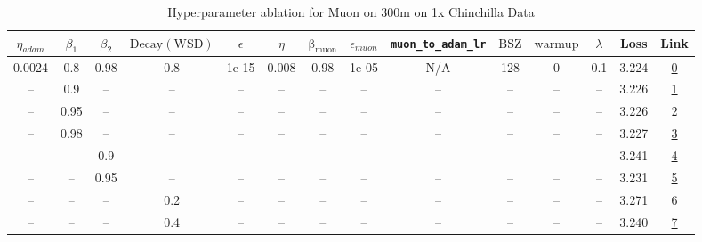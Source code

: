 \begin{table}[H]
\centering
\caption{Hyperparameter ablation for Muon on 300m on 1x Chinchilla Data}
\label{tab:ablation_muon_300m_1}
\begin{tabular}{cccccccccccccc}
\toprule
$\eta_{adam}$ & $\beta_1$ & $\beta_2$ & $\mathrm{Decay (WSD)}$ & $\epsilon$ & $\eta$ & $\mathrm{\beta_{muon}}$ & $\epsilon_{muon}$ & \texttt{muon\_to\_adam\_lr} & $\mathrm{BSZ}$ & $\mathrm{warmup}$ & $\lambda$ & Loss & Link \\
\midrule
0.0024 & 0.8 & 0.98 & 0.8 & 1e-15 & 0.008 & 0.98 & 1e-05 & N/A & 128 & 0 & 0.1 & 3.224 & \href{https://wandb.ai/stanford-mercury/optimizer-scaling/runs/sweep-300m-6B-muon103aa7lr0.008-wd0.1-minlr0-warmup0-b10.8-b20.9-299b18}{0} \\
\midrule
-- & 0.9 & -- & -- & -- & -- & -- & -- & -- & -- & -- & -- & 3.226 & \href{https://wandb.ai/stanford-mercury/optimizer-scaling/runs/sweep-300m-6B-muon1fae7blr0.008-wd0.1-minlr0-warmup0-b10.9-b20.9-ce27cb}{1} \\
-- & 0.95 & -- & -- & -- & -- & -- & -- & -- & -- & -- & -- & 3.226 & \href{https://wandb.ai/stanford-mercury/optimizer-scaling/runs/sweep-300m-6B-muon478bc1lr0.008-wd0.1-minlr0-warmup0-b10.95-b20.-ead356}{2} \\
-- & 0.98 & -- & -- & -- & -- & -- & -- & -- & -- & -- & -- & 3.227 & \href{https://wandb.ai/stanford-mercury/optimizer-scaling/runs/sweep-300m-6B-muone28078lr0.008-wd0.1-minlr0-warmup0-b10.98-b20.-1e1d01}{3} \\
-- & -- & 0.9 & -- & -- & -- & -- & -- & -- & -- & -- & -- & 3.241 & \href{https://wandb.ai/stanford-mercury/optimizer-scaling/runs/sweep-300m-6B-muon2aaf08lr0.008-wd0.1-minlr0-warmup0-b10.8-b20.9-5e17f0}{4} \\
-- & -- & 0.95 & -- & -- & -- & -- & -- & -- & -- & -- & -- & 3.231 & \href{https://wandb.ai/stanford-mercury/optimizer-scaling/runs/sweep-300m-6B-muon21c0a4lr0.008-wd0.1-minlr0-warmup0-b10.8-b20.9-c8ff38}{5} \\
-- & -- & -- & 0.2 & -- & -- & -- & -- & -- & -- & -- & -- & 3.271 & \href{https://wandb.ai/stanford-mercury/optimizer-scaling/runs/sweep-300m-6B-muon0f2ff2lr0.008-wd0.1-minlr0-warmup0-b10.8-b20.9-ed24ff}{6} \\
-- & -- & -- & 0.4 & -- & -- & -- & -- & -- & -- & -- & -- & 3.240 & \href{https://wandb.ai/stanford-mercury/optimizer-scaling/runs/sweep-300m-6B-muonc2da39lr0.008-wd0.1-minlr0-warmup0-b10.8-b20.9-aa3a76}{7} \\

\end{tabular}
\end{table}
